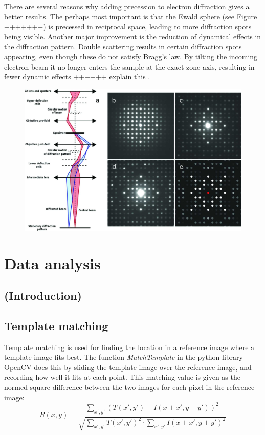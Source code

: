 There are several reasons why adding precession to electron diffraction gives a better results. The perhaps most important is that the Ewald sphere (see Figure +++++++) is precessed in reciprocal space, leading to more diffraction spots being visible. Another major improvement is the reduction of dynamical effects in the diffraction pattern. Double scattering results in certain diffraction spots appearing, even though these do not satisfy Bragg's law. By tilting the incoming electron beam it no longer enters the sample at the exact zone axis, resulting in fewer dynamic effects  ++++++ explain this \cite{new-zeta-method}.

\begin{figure}
\centering
\includegraphics[width=0.7\linewidth]{fig/precession}
\caption{}
\label{fig:precession}
\end{figure}


\section{Data analysis}
	\subsection{(Introduction)}
	\subsection{Template matching}
Template matching is used for finding the location in a reference image where a template image fits best. The function \textit{MatchTemplate} in the python library OpenCV does this by sliding the template image over the reference image, and recording how well it fits at each point. This matching value is given as the normed square difference between the two images for each pixel in the reference image:
\begin{equation}
 R(x,y)= \frac{\sum_{x',y'} (T(x',y')-I(x+x',y+y'))^2}{\sqrt{\sum_{x',y'}T(x',y')^2 \cdot \sum_{x',y'} I(x+x',y+y')^2}}
 \label{eq:matching value}
\end{equation}

